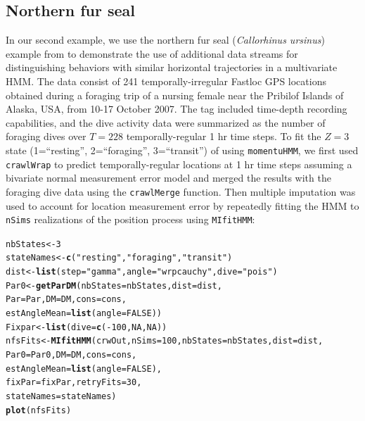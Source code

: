 \documentclass[12pt]{article}\usepackage[]{graphicx}\usepackage[]{color}
\makeatletter
\newcommand{\hlnum}[1]{\textcolor[rgb]{0.686,0.059,0.569}{#1}}%
\newcommand{\hlstr}[1]{\textcolor[rgb]{0.192,0.494,0.8}{#1}}%
\newcommand{\hlopt}[1]{\textcolor[rgb]{0,0,0}{#1}}%
\newcommand{\hlstd}[1]{\textcolor[rgb]{0.345,0.345,0.345}{#1}}%
\newcommand{\hlkwb}[1]{\textcolor[rgb]{0.69,0.353,0.396}{#1}}%
\newcommand{\hlkwc}[1]{\textcolor[rgb]{0.333,0.667,0.333}{#1}}%
\newcommand{\hlkwd}[1]{\textcolor[rgb]{0.737,0.353,0.396}{\textbf{#1}}}%
\newenvironment{kframe}{%
 \def\at@end@of@kframe{}%
 \ifinner\ifhmode%
  \def\at@end@of@kframe{\end{minipage}}%
  \begin{minipage}{\columnwidth}%
 \fi\fi%
 \def\FrameCommand##1{\hskip\@totalleftmargin \hskip-\fboxsep
 \colorbox{shadecolor}{##1}\hskip-\fboxsep
     \hskip-\linewidth \hskip-\@totalleftmargin \hskip\columnwidth}%
 \MakeFramed {\advance\hsize-\width
   \@totalleftmargin\z@ \linewidth\hsize
   \@setminipage}}%
 {\par\unskip\endMakeFramed%
 \at@end@of@kframe}
\newenvironment{knitrout}{}{} %
\makeatother
\begin{document}
\subsection{Northern fur seal}
\label{sec:nfs}
In our second example, we use the northern fur seal ({\it Callorhinus ursinus}) example from \cite{McClintockEtAl2014b} to demonstrate the use of additional data streams for distinguishing behaviors with similar horizontal trajectories in a multivariate HMM. The data consist of 241 temporally-irregular Fastloc GPS locations obtained during a foraging trip of a nursing female near the Pribilof Islands of Alaska, USA, from 10-17 October 2007. The tag included time-depth recording capabilities, and the dive activity data were summarized as the number of foraging dives over $T=228$ temporally-regular 1 hr time steps. To fit the $Z=3$ state (1=``resting'', 2=``foraging'', 3=``transit'') of \cite{McClintockEtAl2014b} using \verb|momentuHMM|, we first used \verb|crawlWrap| to predict temporally-regular locations at 1 hr time steps assuming a bivariate normal measurement error model and merged the results with the foraging dive data using the \verb|crawlMerge| function. Then multiple imputation was used to account for location measurement error by repeatedly fitting the HMM to \verb|nSims| realizations of the position process using \verb|MIfitHMM|:%
\begin{knitrout}
\color{fgcolor}\begin{kframe}
\begin{alltt}
\hlstd{nbStates} \hlkwb{<-} \hlnum{3}
\hlstd{stateNames} \hlkwb{<-} \hlkwd{c}\hlstd{(}\hlstr{"resting"}\hlstd{,} \hlstr{"foraging"}\hlstd{,} \hlstr{"transit"}\hlstd{)}
\hlstd{dist} \hlkwb{<-} \hlkwd{list}\hlstd{(}\hlkwc{step} \hlstd{=} \hlstr{"gamma"}\hlstd{,} \hlkwc{angle} \hlstd{=} \hlstr{"wrpcauchy"}\hlstd{,} \hlkwc{dive} \hlstd{=} \hlstr{"pois"}\hlstd{)}
\hlstd{Par0} \hlkwb{<-} \hlkwd{getParDM}\hlstd{(}\hlkwc{nbStates} \hlstd{= nbStates,} \hlkwc{dist} \hlstd{= dist,}
                 \hlkwc{Par} \hlstd{= Par,} \hlkwc{DM} \hlstd{= DM,} \hlkwc{cons} \hlstd{= cons,}
                 \hlkwc{estAngleMean} \hlstd{=} \hlkwd{list}\hlstd{(}\hlkwc{angle} \hlstd{=} \hlnum{FALSE}\hlstd{))}
\hlstd{Fixpar} \hlkwb{<-} \hlkwd{list}\hlstd{(}\hlkwc{dive} \hlstd{=} \hlkwd{c}\hlstd{(}\hlopt{-}\hlnum{100}\hlstd{,} \hlnum{NA}\hlstd{,} \hlnum{NA}\hlstd{))}
\hlstd{nfsFits} \hlkwb{<-} \hlkwd{MIfitHMM}\hlstd{(crwOut,} \hlkwc{nSims} \hlstd{=} \hlnum{100}\hlstd{,} \hlkwc{nbStates} \hlstd{= nbStates,} \hlkwc{dist} \hlstd{= dist,}
                    \hlkwc{Par0} \hlstd{= Par0,} \hlkwc{DM} \hlstd{= DM,} \hlkwc{cons} \hlstd{= cons,}
                    \hlkwc{estAngleMean} \hlstd{=} \hlkwd{list}\hlstd{(}\hlkwc{angle} \hlstd{=} \hlnum{FALSE}\hlstd{),}
                    \hlkwc{fixPar} \hlstd{= fixPar,} \hlkwc{retryFits} \hlstd{=} \hlnum{30}\hlstd{,}
                    \hlkwc{stateNames}\hlstd{=stateNames)}
\hlkwd{plot}\hlstd{(nfsFits)}
\end{alltt}
\end{kframe}
\end{knitrout}
\end{document}
